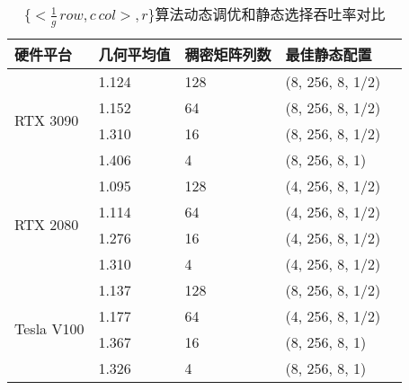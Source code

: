 \begin{table}
  \centering
  \caption{$\{<\frac{1}{g}\,row , c\,col>,r\}$算法动态调优和静态选择吞吐率对比}
  \begin{tabular}{lllll}
  \toprule
  硬件平台 & 几何平均值  & 稠密矩阵列数 & 最佳静态配置 \\
  \midrule
  \multirow{4}{*}{RTX 3090}& 1.124  & 128 & (8, 256, 8, 1/2)\\
                          & 1.152   & 64 & (8, 256, 8, 1/2)\\
                          & 1.310   & 16 & (8, 256, 8, 1/2)\\
                          & 1.406   & 4 & (8, 256, 8, 1)\\
  \hline
  \multirow{4}{*}{RTX 2080}& 1.095  & 128 & (4, 256, 8, 1/2)\\
                          & 1.114   & 64 & (4, 256, 8, 1/2)\\
                          & 1.276   & 16& (4, 256, 8, 1/2)\\
                          & 1.310   & 4 & (4, 256, 8, 1/2)\\
  \hline
  \multirow{4}{*}{Tesla V100}& 1.137  & 128 & (8, 256, 8, 1/2)\\
                          & 1.177   & 64 & (4, 256, 8, 1/2)\\
                          & 1.367   & 16 & (8, 256, 8, 1)\\
                          & 1.326   & 4 & (8, 256, 8, 1)\\
  \bottomrule
  \end{tabular}
  \label{tab:over-sta-rb}
\end{table}
